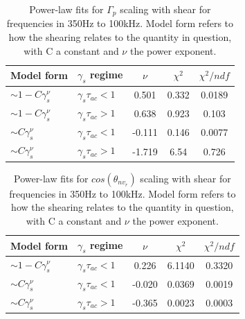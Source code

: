 \documentclass[aip,pop,amsmath,amssymb,preprint,superscriptaddress]{revtex4-1} %
\begin{document}
\begin{table}
\caption{\label{tab:table3}Power-law fits for $\Gamma_{p}$ scaling with shear for frequencies in 350Hz to 100kHz. Model form refers to how the shearing relates to the quantity in question, with C a constant and $\nu$ the power exponent.}
\begin{ruledtabular}
\begin{tabular}{llccc}
Model form&$\gamma_{s}$ regime&$\nu$&$\chi^2$&$\chi^2/ndf$\\
\hline
$\sim 1-C\gamma_{s}^\nu$&$\gamma_{s}\tau_{ac}<1$ &0.501   &0.332    &0.0189\\
$\sim 1-C\gamma_{s}^\nu$&$\gamma_{s}\tau_{ac}>1$ &0.638   &0.923    &0.103\\
$\sim C\gamma_{s}^\nu$&$\gamma_{s}\tau_{ac}<1$   &-0.111  &0.146    &0.0077\\
$\sim C\gamma_{s}^\nu$&$\gamma_{s}\tau_{ac}>1$   &-1.719  &6.54    &0.726\\
\end{tabular}
\end{ruledtabular}
\end{table}

\begin{table}
\caption{\label{tab:table5}Power-law fits for $cos(\theta_{nv_{r}})$ scaling with shear for frequencies in 350Hz to 100kHz. Model form refers to how the shearing relates to the quantity in question, with C a constant and $\nu$ the power exponent.}
\begin{ruledtabular}
\begin{tabular}{llccc}
Model form&$\gamma_{s}$ regime&$\nu$&$\chi^2$&$\chi^2/ndf$\\
\hline
$\sim 1-C\gamma_{s}^\nu$&$\gamma_{s}\tau_{ac}<1$ &0.226   &6.1140    &0.3320\\
$\sim C\gamma_{s}^\nu$&$\gamma_{s}\tau_{ac}<1$   &-0.020  &0.0369    &0.0019\\
$\sim C\gamma_{s}^\nu$&$\gamma_{s}\tau_{ac}>1$   &-0.365  &0.0023    &0.0003\\
\end{tabular}
\end{ruledtabular}
\end{table}
\end{document}
